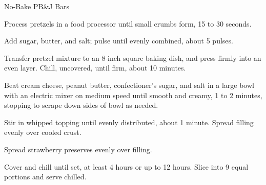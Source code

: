 \documentclass[letterpaper]{book}
\begin{document}
\begin{recipe}{No-Bake PB\&J Bars}{}{}


    Process pretzels in a food processor until small crumbs form, 15 to 30 seconds.


    Add sugar, butter, and salt; pulse until evenly combined, about 5 pulses.

    \newstep

    Transfer pretzel mixture to an 8-inch square baking dish, and press firmly into an even layer.
    Chill, uncovered, until firm, about 10 minutes.


    Beat cream cheese, peanut butter, confectioner's sugar, and salt in a large bowl with an electric mixer on medium speed until smooth and creamy, 1 to 2 minutes, stopping to scrape down sides of bowl as needed.


    Stir in whipped topping until evenly distributed, about 1 minute. Spread filling evenly over cooled crust.


    Spread strawberry preserves evenly over filling.

    \newstep

    Cover and chill until set, at least 4 hours or up to 12 hours. Slice into 9 equal portions and serve chilled.

\end{recipe}
\end{document}
